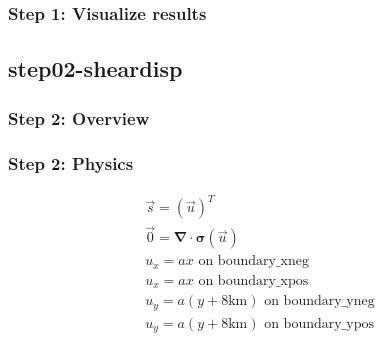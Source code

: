 \documentclass[aspectratio=169]{beamer}
\begin{document}
\begin{frame}
  \frametitle{Step 1: Visualize results}

    
\end{frame}


\subsection{step02-sheardisp}

\begin{frame}
  \frametitle{Step 2: Overview}

      
\end{frame}


\begin{frame}[t]
  \frametitle{Step 2: Physics}
  \summary{}

  \begin{minipage}{0.35\textwidth}
    {\scriptsize
    \begin{gather*}
      \vec{s} = \left( \vec{u} \right)^T \\
      \vec{0} = \boldsymbol{\nabla} \cdot \boldsymbol{\sigma}(\vec{u}) \\
      u_x = ax \text{ on boundary\_xneg} \\
      u_x = ax \text{ on boundary\_xpos} \\
      u_y = a(y+8\mathrm{km}) \text{ on boundary\_yneg} \\
      u_y = a(y+8\mathrm{km}) \text{ on boundary\_ypos}
    \end{gather*}}
  \end{minipage}
  \hfill
  \begin{minipage}{0.55\textwidth}
  \end{minipage}
      
\end{frame}
\end{document}
